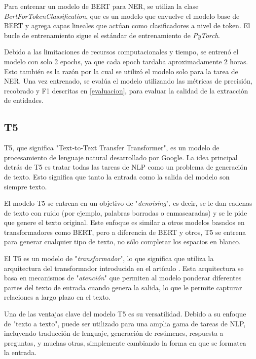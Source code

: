 \documentclass[10pt]{article} %
\begin{document}
	Para entrenar un modelo de BERT para NER, se utiliza la clase \textit{BertForTokenClassification}, que es un modelo que envuelve el modelo base de BERT y agrega capas lineales que actúan como clasificadores a nivel de token. El bucle de entrenamiento sigue el estándar de entrenamiento de \textit{PyTorch}.
	
	Debido a las limitaciones de recursos computacionales y tiempo, se entrenó el modelo con solo 2 epochs, ya que cada epoch tardaba aproximadamente 2 horas. Esto también es la razón por la cual se utilizó el modelo solo para la tarea de NER. Una vez entrenado, se evalúa el modelo utilizando las métricas de precisión, recobrado y F1 descritas en \ref{evaluacion},  para evaluar la calidad de la extracción de entidades.
	
	\subsection{T5}
	
	T5, que significa "Text-to-Text Transfer Transformer", es un modelo de procesamiento de lenguaje natural desarrollado por Google. La idea principal detrás de T5 es tratar todas las tareas de NLP como un problema de generación de texto. Esto significa que tanto la entrada como la salida del modelo son siempre texto.
	
	El modelo T5 se entrena en un objetivo de "\textit{denoising}", es decir, se le dan cadenas de texto con ruido (por ejemplo, palabras borradas o enmascaradas) y se le pide que genere el texto original. Este enfoque es similar a otros modelos basados en transformadores como BERT, pero a diferencia de BERT y otros, T5 se entrena para generar cualquier tipo de texto, no sólo completar los espacios en blanco.
	
	El T5 es un modelo de "\textit{transformador}", lo que significa que utiliza la arquitectura del transformador introducida en el art\'iculo \cite{attention}. Esta arquitectura se basa en mecanismos de "\textit{atención}" que permiten al modelo ponderar diferentes partes del texto de entrada cuando genera la salida, lo que le permite capturar relaciones a largo plazo en el texto.
	
	Una de las ventajas clave del modelo T5 es su versatilidad. Debido a su enfoque de "texto a texto", puede ser utilizado para una amplia gama de tareas de NLP, incluyendo traducción de lenguaje, generación de resúmenes, respuesta a preguntas, y muchas otras, simplemente cambiando la forma en que se formatea la entrada.
	
\end{document}

